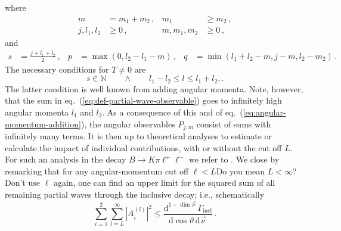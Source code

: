 \documentclass[aps,prd,reprint,nofootinbib,preprintnumbers]{revtex4}
\newcommand{\rmdx}[1]{\mbox{d} #1 \,} %
\newcommand{\refeq}[1]{eq.~(\ref{eq:#1})}
\renewcommand{\theta}{\vartheta}
\newcommand{\fred}[1]{{\color{brown!85!black}#1}}
\begin{document}
where
\begin{equation}
\begin{aligned}
    m & = m_1 + m_2\,, &
    m_1 & \geq m_2\,,  \\
    j, l_1, l_2 & \geq 0\,, &
    m, m_1, m_2 & \geq 0\,,
\end{aligned}
\end{equation}
and
\begin{equation}
\begin{aligned}
    s & = \frac{j + l_1 + l_2}{2}\,, &
    p & = \max(0, l_2 - l_1 - m)\,, &
    q & = \min(l_1 + l_2 - m, j - m, l_2 - m_2)\,.
\end{aligned}
\end{equation}
The necessary conditions for $T \neq 0$ are
\begin{equation}
    \label{eq:angular-momentum-addition}
    s \in \mathbb{N}\qquad \wedge \qquad l_1 - l_2 \leq l \leq l_1 + l_2,.
\end{equation}
The latter condition is well known from adding angular momenta. Note, however, that
the sum in \refeq{def-partial-wave-observable} goes to infinitely high angular momenta $l_1$ and $l_2$. As a consequence
of this and of \refeq{angular-momentum-addition}, the angular observables $P_{j,m}$
consist of sums with infinitely many terms. It is then up to theoretical analyses to
estimate or calculate the impact of individual contributions, with or without the cut off $L$.
For such an analysis in the decay $B\to K\pi\ell^+\ell^-$ we refer to \cite{Das:2014sra}.
We close by remarking that for any angular-momentum cut off $\ell < L$\fred{Do you mean $L < \infty$? Don't use $\ell$ again}, one can find an upper limit for the squared sum
of all remaining partial waves through the inclusive decay; i.e., schematically
\begin{equation}
    \sum_{i=1}^2 \sum_{l=L}^\infty |A_i^{(l)}|^2 \leq \frac{\rmdx{^{1 + \dim\vec\nu}} \Gamma_\text{incl}}{\rmdx{\cos\theta} \rmdx{\vec\nu}}\,.
\end{equation}



\end{document}
